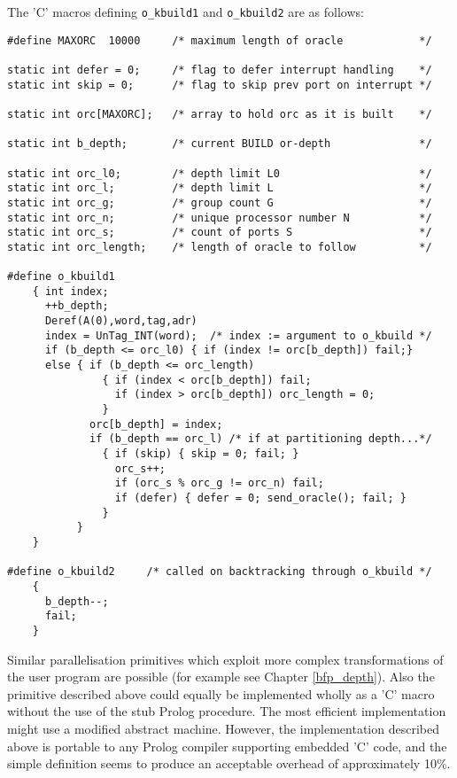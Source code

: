 The 'C' macros defining \texttt{o\_{}kbuild1} and \texttt{o\_{}kbuild2} are
as follows:
\begin{verbatim}
#define MAXORC  10000     /* maximum length of oracle            */

static int defer = 0;     /* flag to defer interrupt handling    */
static int skip = 0;      /* flag to skip prev port on interrupt */

static int orc[MAXORC];   /* array to hold orc as it is built    */

static int b_depth;       /* current BUILD or-depth              */

static int orc_l0;        /* depth limit L0                      */
static int orc_l;         /* depth limit L                       */
static int orc_g;         /* group count G                       */
static int orc_n;         /* unique processor number N           */
static int orc_s;         /* count of ports S                    */
static int orc_length;    /* length of oracle to follow          */

#define o_kbuild1      
    { int index;       
      ++b_depth;       
      Deref(A(0),word,tag,adr) 
      index = UnTag_INT(word);  /* index := argument to o_kbuild */
      if (b_depth <= orc_l0) { if (index != orc[b_depth]) fail;}
      else { if (b_depth <= orc_length) 
               { if (index < orc[b_depth]) fail;
                 if (index > orc[b_depth]) orc_length = 0;
               }                               
             orc[b_depth] = index;             
             if (b_depth == orc_l) /* if at partitioning depth...*/
               { if (skip) { skip = 0; fail; } 
                 orc_s++;                      
                 if (orc_s % orc_g != orc_n) fail;
                 if (defer) { defer = 0; send_oracle(); fail; }  
               }                      
           }                          
    }

#define o_kbuild2     /* called on backtracking through o_kbuild */
    {                                 
      b_depth--;                      
      fail;                           
    }
\end{verbatim}

Similar parallelisation primitives which exploit more complex transformations of the
user program are possible (for example see Chapter \ref{bfp_depth}).  Also the
primitive described above could equally be implemented wholly as a 'C' macro without
the use of the stub Prolog procedure.  The most efficient implementation might use
a modified abstract machine. However, the implementation described above
is portable to any Prolog compiler supporting embedded 'C' code, and the simple
definition seems to produce an acceptable overhead of approximately 10\%.
